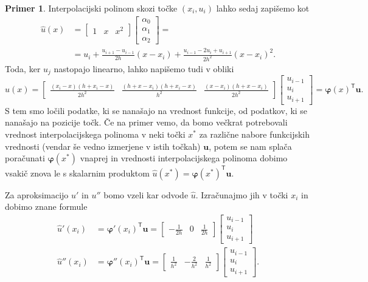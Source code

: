 \documentclass[a4paper,twoside]{article}
\theoremstyle{definition} %
\newtheorem{primer}[definicija]{Primer}
\theoremstyle{plain} %
\numberwithin{equation}{section}
\newcommand{\T}{\mathsf{T}}
\renewcommand{\b}{\boldsymbol}
\renewcommand{\phi}{\varphi}
\begin{document}
\begin{primer}
Interpolacijski polinom skozi točke $(x_i, u_i)$ lahko sedaj zapišemo kot
\begin{align*}
  \hat{u}(x) &=
  \begin{bmatrix}
    1 & x & x^2
  \end{bmatrix}
  \begin{bmatrix}
    \alpha_0 \\ \alpha_1 \\ \alpha_2
  \end{bmatrix} = \\
  &= u_i +\frac{u_{i+1}-u_{i-1}}{2 h}(x-x_i)+\frac{u_{i-1}-2 u_{i}+u_{i+1}}{2
  h^2}(x-x_i)^2.
\end{align*}
Toda, ker $u_j$ nastopajo linearno, lahko napišemo tudi v obliki
\[
  \hat{u}(x) =
  \begin{bmatrix}
  \frac{(x_i-x) (h+x_i-x)}{2 h^2} & \frac{(h+x-x_i)(h+x_i-x)}{h^2} & \frac{(x-x_i) (h+x-x_i)}{2 h^2}
  \end{bmatrix}
  \begin{bmatrix}
    u_{i-1} \\ u_{i} \\ u_{i+1}
  \end{bmatrix}= \b\phi(x)^\T\b u.
\]
S tem smo ločili podatke, ki se nanašajo na vrednost funkcije, od podatkov, ki
se nanašajo na pozicije točk. Če na primer vemo, da bomo večkrat potrebovali
vrednost interpolacijskega polinoma v neki točki $x^\ast$ za različne nabore
funkcijskih vrednosti (vendar še vedno izmerjene v istih točkah) $\b u$, potem
se nam splača poračunati $\b\phi(x^\ast)$ vnaprej in vrednosti
interpolacijskega polinoma dobimo vsakič znova le s skalarnim produktom $\hat
u(x^\ast) = \b\phi(x^\ast) ^\T \b u$.

Za aproksimacijo $u'$ in $u''$ bomo vzeli kar odvode $\hat{u}$. Izračunajmo
jih v točki $x_i$ in dobimo znane formule
\begin{align*}
  \hat u'(x_i) &= \b\phi'(x_i)^\T \b u =
  \begin{bmatrix}
    -\frac{1}{2h} & 0 & \frac{1}{2h}
  \end{bmatrix} \begin{bmatrix}
    u_{i-1} \\ u_{i} \\ u_{i+1}
  \end{bmatrix}\\
  \hat u''(x_i) &= \b\phi''(x_i)^\T \b u =
  \begin{bmatrix}
    \frac{1}{h^2} & -\frac{2}{h^2} & \frac{1}{h^2}
  \end{bmatrix}\begin{bmatrix}
    u_{i-1} \\ u_{i} \\ u_{i+1}
  \end{bmatrix}.
\end{align*}


\end{primer}
\end{document}
